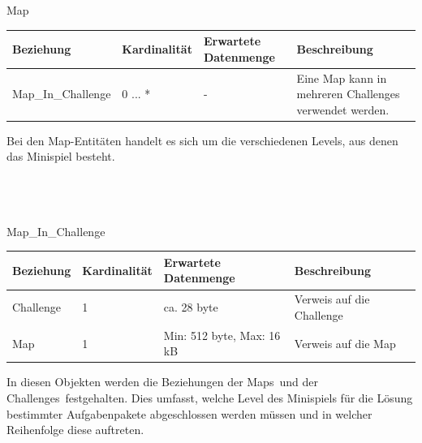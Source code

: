 \begin{entity}{40}{Map}
\begin{center}
	\begin{longtable}{|m{4cm}|m{}|m{}|m{}|}
 	 \hline
 	 \textbf{Beziehung} & \textbf{Kardinalität} &  \textbf{Erwartete Datenmenge} & \textbf{Beschreibung} \\
  	\hline
  	Map\_In\_Challenge & 0 ... *   & - & Eine Map kann in mehreren Challenges verwendet werden.\\
	  \hline
	\end{longtable}
\end{center}
Bei den \glqq Map\grqq-Entitäten handelt es sich um die verschiedenen Levels, aus denen das Minispiel besteht. \\\\\\\
\end{entity}

\begin{entity}{50}{Map\_In\_Challenge}
\begin{center}
	\begin{longtable}{|m{4cm}|m{}|m{}|m{}|}
 	 \hline
 	 \textbf{Beziehung} & \textbf{Kardinalität} &  \textbf{Erwartete Datenmenge} & \textbf{Beschreibung} \\
  	\hline
  	Challenge & 1  & ca. 28 byte & Verweis auf die Challenge\\
	  \hline
  	Map & 1 & Min: 512 byte, Max: 16 kB & Verweis auf die Map\\
	  \hline
	\end{longtable}
\end{center}
In diesen Objekten werden die Beziehungen der \glqq Maps\grqq~und der \glqq Challenges\grqq~festgehalten. Dies umfasst, welche Level des Minispiels für die Lösung bestimmter Aufgabenpakete abgeschlossen werden müssen und in welcher Reihenfolge diese auftreten. \\\
\end{entity}

